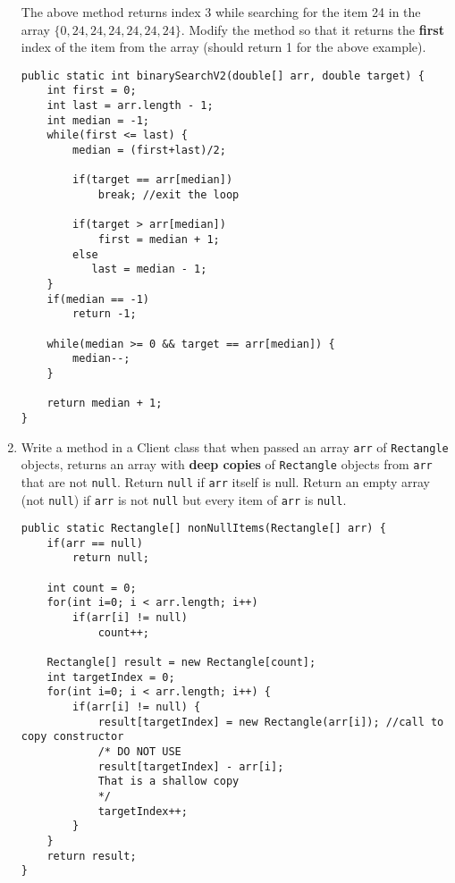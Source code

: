 \begin{questions}
\begin{enumerate}
The above method returns index 3 while searching for the item 24 in the array $\{0,24,24,24,24,24,24\}$. Modify the method so that it returns the \textbf{first} index of the item from the array (should return 1 for the above example).

	\ifprintanswers
\begin{lstlisting}
public static int binarySearchV2(double[] arr, double target) {
	int first = 0;
	int last = arr.length - 1;
	int median = -1;
	while(first <= last) {
   		median = (first+last)/2;
   		
   		if(target == arr[median])
   			break; //exit the loop
   			
   		if(target > arr[median])
			first = median + 1;
		else
		   last = median - 1;
	}
	if(median == -1)
		return -1;

	while(median >= 0 && target == arr[median]) {
		median--;
	}

	return median + 1;
}	
\end{lstlisting}
	\else
	\fi

\item Write a method in a Client class that when passed an array \texttt{arr} of \texttt{Rectangle} objects, returns an array with \textbf{deep copies} of \texttt{Rectangle} objects from \texttt{arr} that are not \texttt{null}. Return \texttt{null} if \texttt{arr} itself is null. Return an empty array (not \texttt{null}) if \texttt{arr} is not \texttt{null} but every item of \texttt{arr} is \texttt{null}.

\begin{solution}
\begin{lstlisting}[style=buggy]
public static Rectangle[] nonNullItems(Rectangle[] arr) {
	if(arr == null)
		return null;
	
	int count = 0;
	for(int i=0; i < arr.length; i++)
		if(arr[i] != null)
			count++;
	
	Rectangle[] result = new Rectangle[count];
	int targetIndex = 0;
	for(int i=0; i < arr.length; i++) {
		if(arr[i] != null) {
			result[targetIndex] = new Rectangle(arr[i]); //call to copy constructor
			/* DO NOT USE 
			result[targetIndex] - arr[i]; 
			That is a shallow copy
			*/
			targetIndex++;
		}
	}
	return result;
}
\end{lstlisting}	
\end{solution}

\end{enumerate}

\end{questions}

